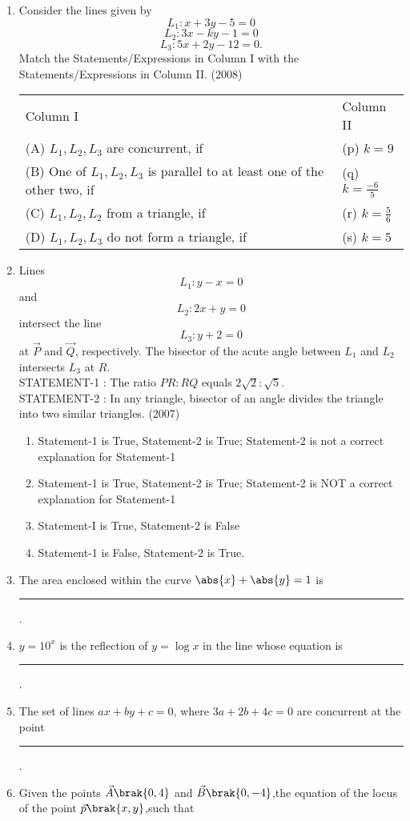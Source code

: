 	\begin{enumerate}
	\item Consider the lines given by
		$$L_1:x+3y-5=0$$ $$L_2:3x-ky-1=0$$ $$L_3:5x+2y-12=0.$$
		Match the Statements/Expressions in {Column I} with the Statements/Expressions in {Column II}. 
		\hfill(2008)
		\begin{tabular}{p{8cm} p{3cm}}
			Column I & Column II \\
			(A) $L_1,L_2,L_3$ are concurrent, if & (p) $k=9$ \\
			(B) One of $L_1,L_2,L_3$ is parallel to at least one of the other two, if & (q) $k=\frac{-6}{5}$ \\
			(C) $L_1,L_2,L_2$ from a triangle, if & (r) $k=\frac{5}{6}$ \\
			(D) $L_1,L_2,L_3$ do not form a triangle, if & (s) $k=5$
		\end{tabular}
\item Lines $$L_{1}: y-x=0$$ and $$L_{2}: 2x+y=0$$ intersect the line $$L_{3}: y+2=0$$ at $\vec{P}$ and $\vec{Q}$, respectively. The bisector of the acute 
angle between $L_{1}$ and $L_{2}$ intersects $L_{3}$ at $R$.\\
{STATEMENT-1 :} The ratio $PR:RQ$ equals $2\sqrt{2}:\sqrt{5}$.\\
{STATEMENT-2 :} In any triangle, bisector of an angle divides the triangle into two similar triangles.
\hfill{(2007)}
   \begin{enumerate}
   \item Statement-1 is True, Statement-2 is True; Statement-2 
is not a correct explanation for Statement-1 
   \item Statement-1 is True, Statement-2 is True; Statement-2 
is NOT a correct explanation for Statement-1 
   \item Statement-I is True, Statement-2 is False
   \item Statement-1 is False, Statement-2 is True. 
   \end{enumerate}
	\item The area enclosed within the curve $\abs{x}+\abs{y} =1$ is \rule{1cm}{0.01pt}.
    \hfill {}
    \item $y = 10^x $ is the reflection of $y=\log x$ in the line whose equation is \rule{1cm}{0.01pt}.
    \hfill{}
    \item The set of lines $ax+by+c=0$, where $3a+2b+4c=0$ are concurrent at the point \rule{1cm}{0.01pt}.
    \hfill{}
    \item Given the points $\vec{A}\brak{0,4}$ and $\vec{B}\brak{0,-4}$,the equation of the locus of the point $\vec{p}\brak{x,y}$,such that 

\end{enumerate}
